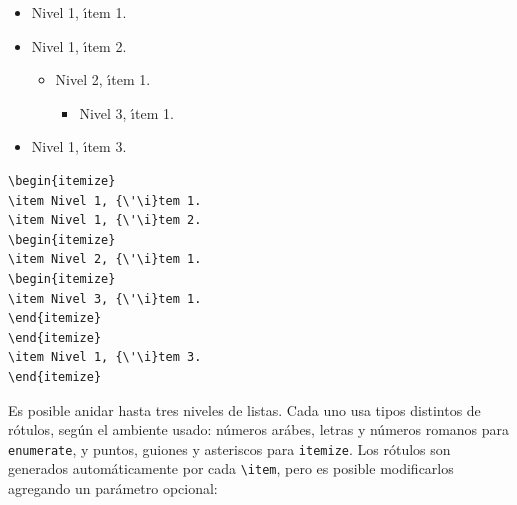 \vspace{.5cm}
{\small
\begin{minipage}[t]{5.2cm}
\begin{itemize}
\item Nivel 1, {\'\i}tem 1.
\item Nivel 1, {\'\i}tem 2.
\begin{itemize}
\item Nivel 2, {\'\i}tem 1.
\begin{itemize}
\item Nivel 3, {\'\i}tem 1.
\end{itemize}
\end{itemize}
\item Nivel 1, {\'\i}tem 3.
\end{itemize}
\end{minipage}
\hspace{2cm}
\begin{minipage}[t]{7cm}
\begin{verbatim}
\begin{itemize}
\item Nivel 1, {\'\i}tem 1.
\item Nivel 1, {\'\i}tem 2.
\begin{itemize}
\item Nivel 2, {\'\i}tem 1.
\begin{itemize}
\item Nivel 3, {\'\i}tem 1.
\end{itemize}
\end{itemize}
\item Nivel 1, {\'\i}tem 3.
\end{itemize}
\end{verbatim}
\end{minipage}
}
\vspace{.5cm}

Es posible anidar hasta tres niveles de listas. Cada uno usa tipos
distintos de r{\'o}tulos, seg{\'u}n el ambiente usado: n{\'u}meros ar{\'a}bes, letras
y n{\'u}meros romanos para \verb+enumerate+, y puntos, guiones y
asteriscos para \verb+itemize+. Los r{\'o}tulos son generados
autom{\'a}ticamente por cada \verb+\item+, pero es posible modificarlos
agregando un par{\'a}metro opcional:

